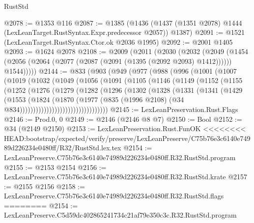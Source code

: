 \begin{lexlean}{RustStd}
\begin{coremodule}
{\begin{coremodule}
{{{{{{{{{{@2078 := @1353 @116
@2087 := @1385
    (@1436 (@1437 (@1351 @2078) @1444 (LexLeanTarget.RustSyntax.Expr.predecessor @2057)) @1387)
@2091 := @1521 (LexLeanTarget.RustSyntax.Ctor.ok @2036 @1995)
@2092 := @2001 @1405
@2093 := @1624 @2078
@2108 := @2009
    (@2011
      (@2030
        (@2032
          (@2049
            (@1454 (@2056 (@2064 (@2077 (@2087 (@2091 (@1395 (@2092 @2093) @1412)))))) @1544)))))
@2144 := @833
    (@903
      (@949
        (@977
          (@988
            (@996
              (@1001
                (@1007
                  (@1019
                    (@1032
                      (@1049
                        (@1056
                          (@1091
                            (@1105
                              (@1146
                                (@1149
                                  (@1152
                                    (@1155
                                      (@1252
                                        (@1276
                                          (@1279
                                            (@1282
                                              (@1296
                                                (@1302
                                                  (@1328
                                                    (@1331
                                                      (@1341
                                                        (@1429
                                                          (@1553
                                                            (@1824
                                                              (@1870
                                                                (@1977
                                                                  (@835
                                                                    (@1996 @2108)
                                                                    (@34
                                                                      @834)))))))))))))))))))))))))))))))))
@2145 := LexLeanPreservation.Rust.Flags
@2146 := Prod.{0, 0}
@2149 := @2146 (@2146 @8 @7)
@2150 := Bool
@2152 := @34 (@2149 @2150)
@2153 := LexLeanPreservation.Rust.FunOK
<<<<<<<< HEAD:bootstrap/expected/verify/preserve/LexLeanPreserve/C75b76e3c6140e74989d226234e0480ff/R32/RustStd.lex.tex
@2154 := LexLeanPreserve.C75b76e3c6140e74989d226234e0480ff.R32.RustStd.program
@2155 := @2153 @2154
@2156 := LexLeanPreserve.C75b76e3c6140e74989d226234e0480ff.R32.RustStd.krate
@2157 := @2155 @2156
@2158 := LexLeanPreserve.C75b76e3c6140e74989d226234e0480ff.R32.RustStd.flags
========
@2154 := LexLeanPreserve.C5d59dc402865241734c21af79e350c3c.R32.RustStd.program
}}}}}}}}}}
\end{coremodule}}
\end{coremodule}
\end{lexlean}
